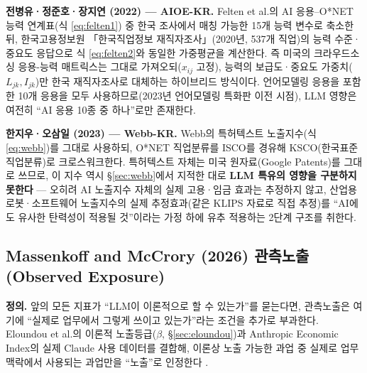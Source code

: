 \documentclass[11pt]{article}
\begin{document}
\textbf{전병유·정준호·장지연 (2022) --- AIOE-KR.} Felten et al.의 AI 응용--O*NET 능력 연계표(식 \eqref{eq:felten1}) 중 한국 조사에서 매칭 가능한 15개 능력 변수로 축소한 뒤, 한국고용정보원 「한국직업정보 재직자조사」(2020년, 537개 직업)의 능력 수준·중요도 응답으로 식 \eqref{eq:felten2}와 동일한 가중평균을 계산한다. 즉 미국의 크라우드소싱 응용-능력 매트릭스는 그대로 가져오되($x_{ij}$ 고정), 능력의 보급도·중요도 가중치($L_{jk}, I_{jk}$)만 한국 재직자조사로 대체하는 하이브리드 방식이다. 언어모델링 응용을 포함한 10개 응용을 모두 사용하므로(2023년 언어모델링 특화판 이전 시점), LLM 영향은 여전히 ``AI 응용 10종 중 하나''로만 존재한다.

\textbf{한지우·오삼일 (2023) --- Webb-KR.} Webb의 특허텍스트 노출지수(식 \eqref{eq:webb})를 그대로 사용하되, O*NET 직업분류를 ISCO를 경유해 KSCO(한국표준직업분류)로 크로스워크한다. 특허텍스트 자체는 미국 원자료(Google Patents)를 그대로 쓰므로, 이 지수 역시 \S\ref{sec:webb}에서 지적한 대로 \textbf{LLM 특유의 영향을 구분하지 못한다} --- 오히려 AI 노출지수 자체의 실제 고용·임금 효과는 추정하지 않고, 산업용 로봇·소프트웨어 노출지수의 실제 추정효과(같은 KLIPS 자료로 직접 추정)를 ``AI에도 유사한 탄력성이 적용될 것''이라는 가정 하에 유추 적용하는 2단계 구조를 취한다.

\subsection{Massenkoff and McCrory (2026) 관측노출(Observed Exposure)}
\label{sec:massenkoff}

\textbf{정의.} 앞의 모든 지표가 ``LLM이 이론적으로 할 수 있는가''를 묻는다면, 관측노출은 여기에 ``실제로 업무에서 그렇게 쓰이고 있는가''라는 조건을 추가로 부과한다. Eloundou et al.의 이론적 노출등급($\beta$, \S\ref{sec:eloundou})과 Anthropic Economic Index의 실제 Claude 사용 데이터를 결합해, 이론상 노출 가능한 과업 중 실제로 업무 맥락에서 사용되는 과업만을 ``노출''로 인정한다 \parencite{massenkoff-2026-labor-market-impacts-of-ai}.
\end{document}
